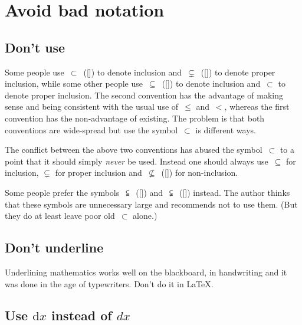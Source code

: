 




\section{Avoid bad notation}



\subsection{Don’t use }

Some people use~$\subset$~([\comname]) to denote inclusion and~$\subsetneq$~([\comname]) to denote proper inclusion, while some other people use~$\subseteq$~([\comname]) to denote inclusion and~$\subset$ to denote proper inclusion.
The second convention has the advantage of making sense and being consistent with the usual use of~$\leq$ and~$<$, whereas the first convention has the non-advantage of existing.
The problem is that both conventions are wide-spread but use the symbol~$\subset$ is different ways.

The conflict between the above two conventions has abused the symbol~$\subset$ to a point that it should simply \emph{never} be used.
Instead one should always use~$\subseteq$ for inclusion, $\subsetneq$ for proper inclusion and~$\nsubseteq$~([\comname]) for non-inclusion.

Some people prefer the symbols~$\subseteqq$~([\comname]) and~$\subsetneqq$~([\comname]) instead.
The author thinks that these symbols are unnecessary large and recommends not to use them.
(But they do at least leave poor old~$\subset$ alone.)



\subsection{Don’t underline}

Underlining mathematics works well on the blackboard, in handwriting and it was done in the age of typewriters.
Don’t do it in {\LaTeX}.



\subsection{Use \texorpdfstring{$\mathrm{d}x$}{dx} instead of \texorpdfstring{$dx$}{dx}}

